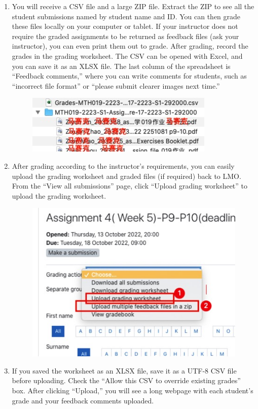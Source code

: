 \begin{enumerate}
\begin{figure}[H]
        \end{figure}
    \item You will receive a CSV file and a large ZIP file. Extract the ZIP to see all the student submissions named by student name and ID. You can then grade these files locally on your computer or tablet. If your instructor does not require the graded assignments to be returned as feedback files (ask your instructor), you can even print them out to grade. After grading, record the grades in the grading worksheet. The CSV can be opened with Excel, and you can save it as an XLSX file. The last column of the spreadsheet is “Feedback comments,” where you can write comments for students, such as “incorrect file format” or “please submit clearer images next time.”
        \begin{figure}[H]
            \centering
            \includegraphics[width=0.5\columnwidth]{author-folder/Kai.Wu/LMO_Downloaded.jpg}
        \end{figure}
    \item After grading according to the instructor’s requirements, you can easily upload the grading worksheet and graded files (if required) back to LMO. From the “View all submissions” page, click “Upload grading worksheet” to upload the grading worksheet.
        \begin{figure}[H]
            \centering
            \includegraphics[width=0.5\columnwidth]{author-folder/Kai.Wu/LMO_upload.jpg}
        \end{figure}
    \item If you saved the worksheet as an XLSX file, save it as a UTF-8 CSV file before uploading. Check the “Allow this CSV to override existing grades” box. After clicking “Upload,” you will see a long webpage with each student’s grade and your feedback comments uploaded. 

\end{enumerate}
